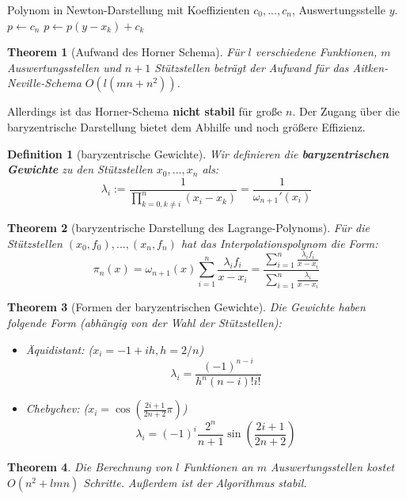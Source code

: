 \documentclass[10pt,a4paper]{article}
\newtheorem{theorem}{Theorem}
\newtheorem{definition}{Definition}
\begin{document}
	\begin{algorithm}
		\caption{Horner-Schema}
		\begin{algorithmic}
			\Require Polynom in Newton-Darstellung mit Koeffizienten $c_0, ..., c_n$, Auswertungsstelle $y$.
			\State $p\leftarrow c_n$
			\State $p \leftarrow p(y -x_k)+c_k$
			\EndFor
		\end{algorithmic}
	\end{algorithm}
	\begin{theorem}[Aufwand des Horner Schema]
		Für $l$ verschiedene Funktionen, $m$ Auswertungsstellen und $n+1$ Stützstellen beträgt der Aufwand für das Aitken-Neville-Schema $O(l(mn+n^2))$.
	\end{theorem}
	Allerdings ist das Horner-Schema \textbf{nicht stabil} für große $n$. Der Zugang über die baryzentrische Darstellung bietet dem Abhilfe und noch größere Effizienz.
	\begin{definition}[baryzentrische Gewichte]
		Wir definieren die \textbf{baryzentrischen Gewichte}  zu den Stützstellen $x_0, ..., x_n$ als:
		$$\lambda_i := \frac{1}{\prod_{k=0, k\neq i}^n(x_i-x_k)} = \frac{1}{\omega_{n+1}'(x_i)}$$
	\end{definition}
	\begin{theorem}[baryzentrische Darstellung des Lagrange-Polynoms]
		Für die Stützstellen $(x_0, f_0), ..., (x_n, f_n)$ hat das Interpolationspolynom die Form:
		$$\pi_n(x)=\omega_{n+1}(x)\sum_{i=1}^{n}\frac{\lambda_if_i}{x-x_i} = \frac{\sum_{i=1}^{n}\frac{\lambda_if_i}{x-x_i}}{\sum_{i=1}^{n}\frac{\lambda_i}{x-x_i}}$$
	\end{theorem}
	\begin{theorem}[Formen der baryzentrischen Gewichte] 
		Die Gewichte haben folgende Form (abhängig von der Wahl der Stützstellen):
		\begin{itemize}
			\item Äquidistant: ($x_i = -1 + ih, h=2/n$) 
			$$\lambda_i = \frac{(-1)^{n-i}}{h^n(n-i)!i!}$$
			\item Chebychev: ($x_i = \cos(\frac{2i+1}{2n+2}\pi)$)
			$$\lambda_i = (-1)^i\frac{2^n}{n+1}\sin(\frac{2i+1}{2n+2})$$
		\end{itemize}
	\end{theorem}
	\begin{theorem}
		Die Berechnung von $l$ Funktionen an $m$ Auswertungsstellen kostet $O(n^2+lmn)$ Schritte. Außerdem ist der Algorithmus stabil.
	\end{theorem}
\end{document}
